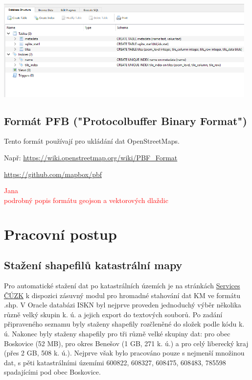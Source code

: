 \documentclass[12pt]{article}
\begin{document}
\begin{center}
	\includegraphics[width=13cm]{./img/mbtiles_db_structure.png}
\end{center}

\subsection{Formát PFB ("Protocolbuffer Binary Format")}
Tento formát používají pro ukládání dat OpenStreetMaps.

Např: \url{https://wiki.openstreetmap.org/wiki/PBF_Format}

\url{https://github.com/mapbox/pbf}

\textcolor{red}{
Jana\\
podrobný popis formátu geojson a vektorových dlaždic}

\clearpage 
\section{Pracovní postup}

\subsection{Stažení shapefilů katastrální mapy} 
Pro automatické stažení dat po katastrálních územích je na stránkách \href{http://services.cuzk.cz/shp/ku/QGIS-plugin/QGIS_verze-3.x/}{Services ČÚZK} k dispozici zásuvný modul pro hromadné stahování dat KM ve formátu .shp. V Oracle databázi ISKN byl nejprve proveden jednoduchý výběr několika různě velký skupin k. ú. a jejich export do textových souborů. Po zadání připraveného seznamu byly staženy shapefily rozčleněné do složek podle kódu k. ú. Nakonec byly staženy shapefily pro tři různě velké skupiny dat:  pro obec Boskovice (52 MB), pro okres Benešov (1 GB, 271 k. ú.) a pro celý liberecký kraj (přes 2 GB, 508 k. ú.). Nejprve však bylo pracováno pouze s nejmenší množinou dat, s pěti katastrálními územími 600822, 608327, 608475, 608483, 785598 spadajícími pod obec Boskovice. 
\end{document}

